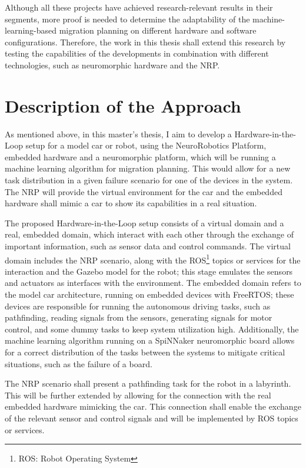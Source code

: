 Although all these projects have achieved research-relevant results in their segments, more proof is needed to determine the adaptability of the machine-learning-based migration planning on different hardware and software configurations. Therefore, the work in this thesis shall extend this research by testing the capabilities of the developments in combination with different technologies, such as neuromorphic hardware and the NRP.

\section*{Description of the Approach}\label{section:descriptionapproach}
As mentioned above, in this master’s thesis, I aim to develop a Hardware-in-the-Loop setup for a model car or robot, using the NeuroRobotics Platform, embedded hardware and a neuromorphic platform, which will be running a machine learning algorithm for migration planning. This would allow for a new task distribution in a given failure scenario for one of the devices in the system. The NRP will provide the virtual environment for the car and the embedded hardware shall mimic a car to show its capabilities in a real situation.

The proposed Hardware-in-the-Loop setup consists of a virtual domain and a real, embedded domain, which interact with each other through the exchange of important information, such as sensor data and control commands. The virtual domain includes the NRP scenario, along with the ROS\footnote{ROS: Robot Operating System} topics or services for the interaction and the Gazebo model for the robot; this stage emulates the sensors and actuators as interfaces with the environment. The embedded domain refers to the model car architecture, running on embedded devices with FreeRTOS; these devices are responsible for running the autonomous driving tasks, such as pathfinding, reading signals from the sensors, generating signals for motor control, and some dummy tasks to keep system utilization high. Additionally, the machine learning algorithm running on a SpiNNaker neuromorphic board allows for a correct distribution of the tasks between the systems to mitigate critical situations, such as the failure of a board.

The NRP scenario shall present a pathfinding task for the robot in a labyrinth. This will be further extended by allowing for the connection with the real embedded hardware mimicking the car. This connection shall enable the exchange of the relevant sensor and control signals and will be implemented by ROS topics or services.

